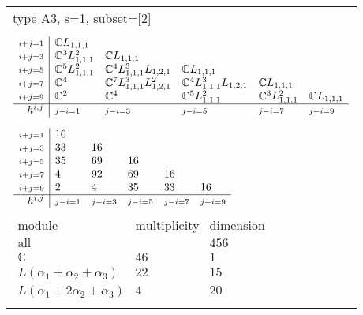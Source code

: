 \documentclass[crop,border=2mm]{standalone}
\begin{document}
\begin{tabular}{l}
{\huge type A3, s=1, subset=[2]}\\ \\


$\displaystyle
\begin{array}{r|l l l l l}
	{\scriptstyle i+j=1}&\mathbb{C}L_{1,1,1}&&&&\\
	{\scriptstyle i+j=3}&\mathbb{C}^{3}L_{1,1,1}^{2}&\mathbb{C}L_{1,1,1}&&&\\
	{\scriptstyle i+j=5}&\mathbb{C}^{5}L_{1,1,1}^{2}&\mathbb{C}^{4}L_{1,1,1}^{3}L_{1,2,1}&\mathbb{C}L_{1,1,1}&&\\
	{\scriptstyle i+j=7}&\mathbb{C}^{4}&\mathbb{C}^{7}L_{1,1,1}^{3}L_{1,2,1}^{2}&\mathbb{C}^{4}L_{1,1,1}^{3}L_{1,2,1}&\mathbb{C}L_{1,1,1}&\\
	{\scriptstyle i+j=9}&\mathbb{C}^{2}&\mathbb{C}^{4}&\mathbb{C}^{5}L_{1,1,1}^{2}&\mathbb{C}^{3}L_{1,1,1}^{2}&\mathbb{C}L_{1,1,1}\\
	\hline h^{i,j}&{\scriptstyle j-i=1}&{\scriptstyle j-i=3}&{\scriptstyle j-i=5}&{\scriptstyle j-i=7}&{\scriptstyle j-i=9}
\end{array}
$ \\ \\


$\displaystyle
\begin{array}{r|l l l l l}
	{\scriptstyle i+j=1}&16&&&&\\
	{\scriptstyle i+j=3}&33&16&&&\\
	{\scriptstyle i+j=5}&35&69&16&&\\
	{\scriptstyle i+j=7}&4&92&69&16&\\
	{\scriptstyle i+j=9}&2&4&35&33&16\\
	\hline h^{i,j}&{\scriptstyle j-i=1}&{\scriptstyle j-i=3}&{\scriptstyle j-i=5}&{\scriptstyle j-i=7}&{\scriptstyle j-i=9}
\end{array}
$ \\ \\


$\displaystyle
\begin{array}{rll}
	\text{module}&\text{multiplicity}&\text{dimension} \\ \hline \text{all}&&456 \\
	\mathbb{C}&46&1\\
	L\left(\alpha_{1}+\alpha_{2}+\alpha_{3}\right)&22&15\\
	L\left(\alpha_{1}+ 2\alpha_{2}+\alpha_{3}\right)&4&20
\end{array}
$ \\ \\

\end{tabular}
\end{document}
